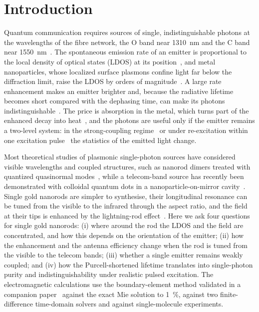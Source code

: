 \documentclass[11pt,a4paper]{article}
\begin{document}
\section{Introduction}
Quantum communication requires sources of single, indistinguishable photons at the wavelengths of the fibre network,
the O band near \SI{1310}{nm} and the C band near \SI{1550}{nm}~\cite{aharonovich,senellart}. The spontaneous emission
rate of an emitter is proportional to the local density of optical states (LDOS) at its position~\cite{purcell,novotny},
and metal nanoparticles, whose localized surface plasmons confine light far below the diffraction limit, raise the LDOS
by orders of magnitude~\cite{koenderink,akselrod,tame2013}. A large rate enhancement makes an emitter brighter and,
because the radiative lifetime becomes short compared with the dephasing time, can make its photons
indistinguishable~\cite{grange2015}. The price is absorption in the metal, which turns part of the enhanced decay into
heat~\cite{anger,kuhn}, and the photons are useful only if the emitter remains a two-level system: in the strong-coupling
regime~\cite{torma2015,chikkaraddy2016} or under re-excitation within one excitation pulse~\cite{fischer2016} the
statistics of the emitted light change.

Most theoretical studies of plasmonic single-photon sources have considered visible wavelengths and coupled
structures, such as nanorod dimers treated with quantized quasinormal modes~\cite{ge2014,franke2019,hughes2019}, while a
telecom-band source has recently been demonstrated with colloidal quantum dots in a nanoparticle-on-mirror
cavity~\cite{zhang2025}. Single gold nanorods are simpler to synthesise, their longitudinal resonance can be tuned from
the visible to the infrared through the aspect ratio, and the field at their tips is enhanced by the lightning-rod
effect~\cite{khatua,mohammadi}. Here we ask four questions for single gold nanorods: (i) where around the rod the LDOS
and the field are concentrated, and how this depends on the orientation of the emitter; (ii) how the enhancement and
the antenna efficiency change when the rod is tuned from the visible to the telecom bands; (iii) whether a single
emitter remains weakly coupled; and (iv) how the Purcell-shortened lifetime translates into single-photon purity and
indistinguishability under realistic pulsed excitation. The electromagnetic calculations use the boundary-element
method validated in a companion paper~\cite{paper1} against the exact Mie solution to \SI{1}{\percent}, against two
finite-difference time-domain solvers and against single-molecule experiments.
\end{document}
